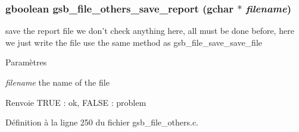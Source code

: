 \subsubsection[{gsb\_\-file\_\-others\_\-save\_\-report}]{\setlength{\rightskip}{0pt plus 5cm}gboolean gsb\_\-file\_\-others\_\-save\_\-report (gchar $\ast$ {\em filename})}\label{gsb__file__others_8c_a1c440737d473de4c6100fef0d770139f}
save the report file we don't check anything here, all must be done before, here we just write the file use the same method as gsb\_\-file\_\-save\_\-save\_\-file


\begin{DoxyParams}{Paramètres}
\item[{\em filename}]the name of the file\end{DoxyParams}
\begin{DoxyReturn}{Renvoie}
TRUE : ok, FALSE : problem 
\end{DoxyReturn}


Définition à la ligne 250 du fichier gsb\_\-file\_\-others.c.


